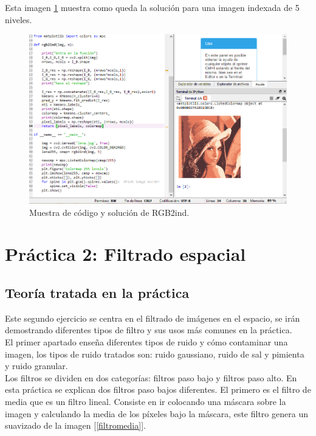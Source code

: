 \documentclass[a4paper,12pt]{report}
\begin{document}
Esta imagen \ref{rgb2ind} muestra como queda la solución para una imagen indexada de 5 niveles.
\begin{figure}[h]
\centering
\includegraphics[width=1\textwidth]{imagenes/rgb2ind}
\caption{Muestra de código y solución de RGB2ind.}
\label{rgb2ind}
\end{figure}


\section{ Práctica 2: Filtrado espacial}

\subsection{Teoría tratada en la práctica}

Este segundo ejercicio se centra en el filtrado de imágenes en el espacio, se irán demostrando diferentes tipos de filtro y sus usos más comunes en la práctica.\\

El primer apartado enseña diferentes tipos de ruido y cómo contaminar una imagen, los tipos de ruido tratados son: ruido gaussiano, ruido de sal y pimienta y ruido granular.\\

Los filtros se dividen en dos categorías: filtros paso bajo y filtros paso alto. En esta práctica se explican dos filtros paso bajos diferentes. El primero es el filtro de media que es un filtro lineal. Consiste en ir colocando una máscara sobre la imagen y calculando la media de los píxeles bajo la máscara, este filtro genera un suavizado de la imagen [\ref{filtromedia}].
\end{document}
